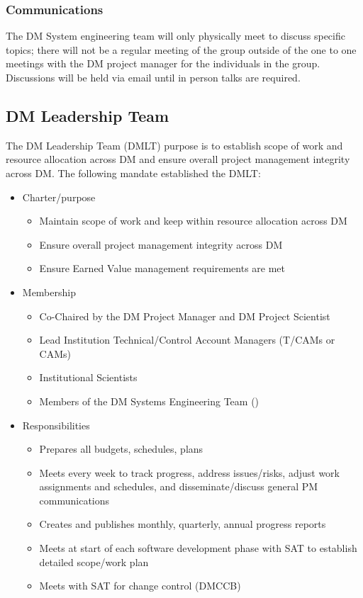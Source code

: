  \subsubsection{Communications}
 The DM System engineering team will only physically meet to discuss specific topics; there will not be a regular meeting of the group outside of the one to one meetings with the DM project manager for the individuals in the group.
Discussions will be held via email until in person talks are required.

\subsection{DM Leadership Team} \label{sect:dmlt}

The DM Leadership Team (DMLT) purpose is to establish scope of work and resource allocation across DM and ensure overall project management integrity across DM.
The following mandate established the DMLT:

\begin{itemize}
\item Charter/purpose
	\begin{itemize}
	\item Maintain scope of work and keep within resource allocation across DM
	\item Ensure overall project management integrity across DM
	\item Ensure Earned Value management requirements are met
	\end{itemize}
\item Membership
	\begin{itemize}
	\item Co-Chaired by the DM Project Manager  and  DM Project Scientist
	\item Lead Institution Technical/Control Account Managers (T/CAMs or CAMs)
	\item Institutional Scientists
	\item Members of the DM Systems Engineering Team ()
	\end{itemize}
\item Responsibilities
	\begin{itemize}
	\item Prepares all budgets, schedules, plans
	\item Meets every week to track progress, address issues/risks, adjust work assignments and schedules, and disseminate/discuss general PM communications
	\item Creates and publishes monthly, quarterly, annual progress reports
	\item Meets at start of each software development phase with SAT to establish detailed scope/work plan
	\item Meets with SAT for change control (DMCCB)
	\end{itemize}
\end{itemize}

